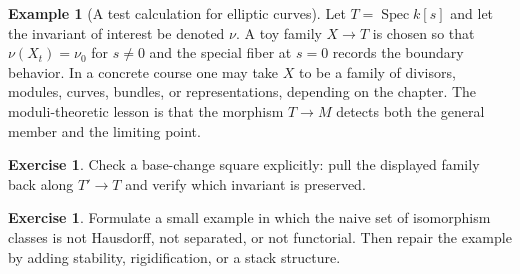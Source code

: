 \documentclass[11pt]{amsart}
\theoremstyle{definition}
\newtheorem{example}[theorem]{Example}
\newtheorem{exercise}[theorem]{Exercise}
\newcommand{\Spec}{\operatorname{Spec}}
\begin{document}
\begin{example}[A test calculation for elliptic curves]
Let $T=\Spec k[s]$ and let the invariant of interest be denoted $\nu$.  A toy family $X\to T$ is chosen so that $\nu(X_t)=\nu_0$ for $s\ne0$ and the special fiber at $s=0$ records the boundary behavior.  In a concrete course one may take $X$ to be a family of divisors, modules, curves, bundles, or representations, depending on the chapter.  The moduli-theoretic lesson is that the morphism $T\to M$ detects both the general member and the limiting point.
\end{example}
\begin{exercise}
Check a base-change square explicitly: pull the displayed family back along $T\prime\to T$ and verify which invariant is preserved.
\end{exercise}
\begin{exercise}
Formulate a small example in which the naive set of isomorphism classes is not Hausdorff, not separated, or not functorial.  Then repair the example by adding stability, rigidification, or a stack structure.
\end{exercise}
\clearpage
\end{document}
